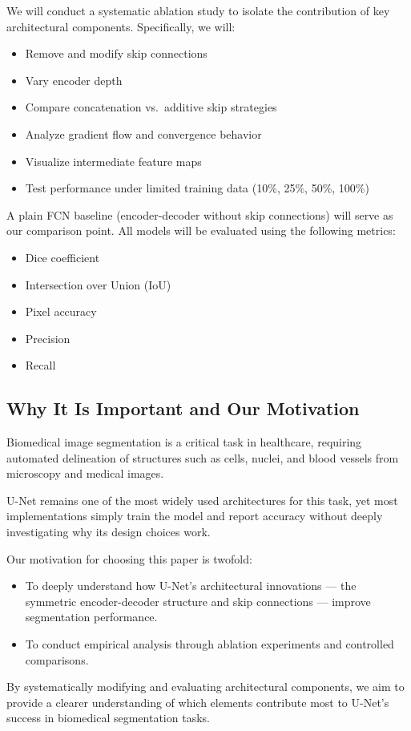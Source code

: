 \documentclass[12pt]{article}
\begin{document}
We will conduct a systematic ablation study to isolate the contribution of key architectural components. Specifically, we will:

\begin{itemize}
\item Remove and modify skip connections
\item Vary encoder depth
\item Compare concatenation vs.\ additive skip strategies
\item Analyze gradient flow and convergence behavior
\item Visualize intermediate feature maps
\item Test performance under limited training data (10\%, 25\%, 50\%, 100\%)
\end{itemize}

A plain FCN baseline (encoder-decoder without skip connections) will serve as our comparison point. All models will be evaluated using the following metrics:

\begin{itemize}
\item Dice coefficient
\item Intersection over Union (IoU)
\item Pixel accuracy
\item Precision
\item Recall
\end{itemize}

\subsection*{Why It Is Important and Our Motivation}

Biomedical image segmentation is a critical task in healthcare, requiring automated delineation of structures such as cells, nuclei, and blood vessels from microscopy and medical images.

U-Net remains one of the most widely used architectures for this task, yet most implementations simply train the model and report accuracy without deeply investigating why its design choices work.

Our motivation for choosing this paper is twofold:

\begin{itemize}
\item To deeply understand how U-Net’s architectural innovations — the symmetric encoder-decoder structure and skip connections — improve segmentation performance.
\item To conduct empirical analysis through ablation experiments and controlled comparisons.
\end{itemize}

By systematically modifying and evaluating architectural components, we aim to provide a clearer understanding of which elements contribute most to U-Net’s success in biomedical segmentation tasks.
\end{document}
